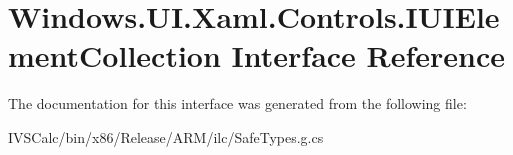 \hypertarget{interface_windows_1_1_u_i_1_1_xaml_1_1_controls_1_1_i_u_i_element_collection}{}\section{Windows.\+U\+I.\+Xaml.\+Controls.\+I\+U\+I\+Element\+Collection Interface Reference}
\label{interface_windows_1_1_u_i_1_1_xaml_1_1_controls_1_1_i_u_i_element_collection}


The documentation for this interface was generated from the following file\+:\begin{DoxyCompactItemize}
\item 
I\+V\+S\+Calc/bin/x86/\+Release/\+A\+R\+M/ilc/Safe\+Types.\+g.\+cs\end{DoxyCompactItemize}
